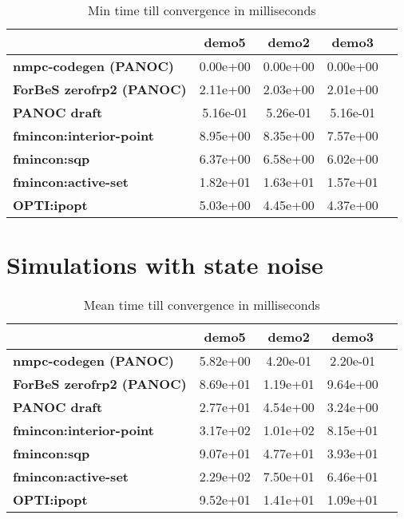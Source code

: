 \begin{table}[H]
	\centering
	\begin{tabular}{|l|	c|c|c|c|}
		\hline
		&\textbf{demo5}&\textbf{demo2}&\textbf{demo3}\\\hline
		\textbf{nmpc-codegen (PANOC)}&0.00e+00&0.00e+00&0.00e+00\\\hline
		\textbf{ForBeS zerofrp2 (PANOC)}&2.11e+00&2.03e+00&2.01e+00\\\hline
		\textbf{PANOC draft}&5.16e-01&5.26e-01&5.16e-01\\\hline
		\textbf{fmincon:interior-point}&8.95e+00&8.35e+00&7.57e+00\\\hline
		\textbf{fmincon:sqp}&6.37e+00&6.58e+00&6.02e+00\\\hline
		\textbf{fmincon:active-set}&1.82e+01&1.63e+01&1.57e+01\\\hline
		\textbf{OPTI:ipopt}&5.03e+00&4.45e+00&4.37e+00\\\hline
	\end{tabular}
	\caption{Min time till convergence in milliseconds}
	\label{tbl:min time till convergence}
\end{table}


\section{Simulations with state noise}
\label{appendix:benchmarks trailer with noise}

\begin{table}[H]
	\centering
	\begin{tabular}{|l|c|c|c|c|}
		\hline
		&\textbf{demo5}&\textbf{demo2}&\textbf{demo3}\\\hline
		\textbf{nmpc-codegen (PANOC)}&5.82e+00&4.20e-01&2.20e-01\\\hline
		\textbf{ForBeS zerofrp2 (PANOC)}&8.69e+01&1.19e+01&9.64e+00\\\hline
		\textbf{PANOC draft}&2.77e+01&4.54e+00&3.24e+00\\\hline
		\textbf{fmincon:interior-point}&3.17e+02&1.01e+02&8.15e+01\\\hline
		\textbf{fmincon:sqp}&9.07e+01&4.77e+01&3.93e+01\\\hline
		\textbf{fmincon:active-set}&2.29e+02&7.50e+01&6.46e+01\\\hline
		\textbf{OPTI:ipopt}&9.52e+01&1.41e+01&1.09e+01\\\hline
	\end{tabular}
	\caption{Mean time till convergence in milliseconds}
	\label{tbl:mean time till convergence with noise}
\end{table}

